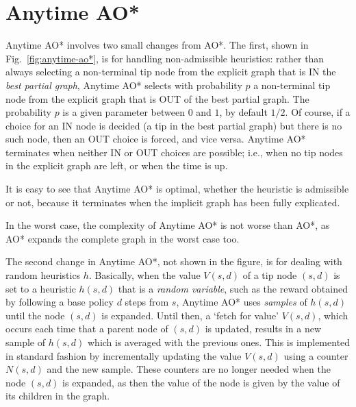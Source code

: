 \documentclass[letterpaper]{article}
\newcommand{\Omit}[1]{}
\begin{document}
\section{Anytime AO*}

\Omit{Anytime AO* is a simple variation of AO* aimed at
anytime optimality even in the presence of random
and non-admissible heuristics. By random heuristic, we mean
a heuristic that corresponds to a random variable that can be sampled,
such as the cost of a base policy.}

Anytime AO* involves two small changes from AO*.
The first, shown in Fig.~\ref{fig:anytime-ao*}, is for handling non-admissible heuristics:
rather than always selecting a non-terminal tip node from the
explicit graph that is IN the \emph{best partial graph}, Anytime
AO* selects with probability $p$ a non-terminal tip node from the
explicit graph that is OUT of the best partial graph. The probability
$p$ is a given parameter between $0$ and $1$, by default $1/2$.
Of course, if a choice for an IN node is decided (a tip in the best
partial graph)  but there is no such node, then an OUT choice is
forced, and vice versa. Anytime AO* terminates when neither IN or OUT choices
are possible; i.e., when no tip nodes in the explicit graph are left,
or when the time is up.

It is easy to see that Anytime AO* is optimal, whether the
heuristic is admissible or not, because it terminates when
the implicit %
graph has been fully explicated.
\Omit{
with the
same terminal nodes and values. The Bellman updates ensure that
the rest of the nodes get their correct (optimal) values.
}
In the worst case, the complexity of Anytime AO* is not worse
than AO*, as AO* expands the complete graph in the worst case
too.

The second change in Anytime AO*, not shown in the figure, is for
dealing with random heuristics $h$.  Basically, when the value $V(s,d)$ of a tip
node $(s,d)$ is set to a heuristic $h(s,d)$ that is a \emph{random variable},
such as the reward obtained by following a base policy $d$ steps from $s$,
Anytime AO* uses \emph{samples} of $h(s,d)$ until the node $(s,d)$
is expanded. Until then, a `fetch for value'  $V(s,d)$, which occurs each time that a parent node of $(s,d)$ is
updated, results in a new sample of $h(s,d)$ which is averaged with the previous ones.
This is implemented in standard fashion by incrementally
updating the value $V(s,d)$ using a counter $N(s,d)$ and the new sample.
These counters are no longer needed when the node $(s,d)$ is expanded, as then
the value of the node is given by the value of its children in the graph.
\end{document}
